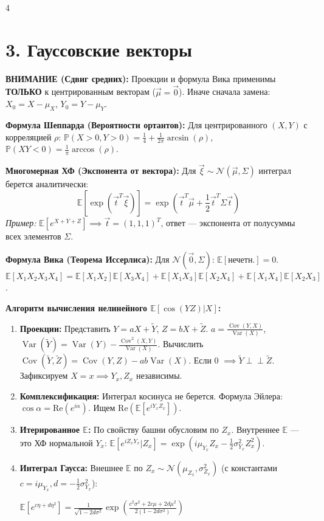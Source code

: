 \documentclass[a4paper, landscape]{article}
\newcommand{\E}{\mathbb{E}}
\renewcommand{\P}{\mathbb{P}}
\newcommand{\N}{\mathcal{N}}
\DeclareMathOperator{\Var}{Var}
\DeclareMathOperator{\Cov}{Cov}
\begin{document}
\begin{multicols*}{4}
\section*{3. Гауссовские векторы}
\textbf{ВНИМАНИЕ (Сдвиг средних):} Проекции и формула Вика применимы \textbf{ТОЛЬКО} к центрированным векторам ($\vec{\mu}=\vec{0}$). Иначе сначала замена: $X_0 = X-\mu_X$, $Y_0=Y-\mu_Y$.

\textbf{Формула Шеппарда (Вероятности ортантов):} 
Для центрированного $(X,Y)$ с корреляцией $\rho$:
$\P(X \!>\! 0, Y \!>\! 0) \!=\! \frac{1}{4} + \frac{1}{2\pi}\arcsin(\rho)$, \ $\P(XY \!<\! 0) \!=\! \frac{1}{\pi}\arccos(\rho)$.

\textbf{Многомерная ХФ (Экспонента от вектора):}
Для $\vec{\xi} \sim \N(\vec{\mu}, \Sigma)$ интеграл берется аналитически:
$$ \E[\exp(\vec{t}^T \vec{\xi})] = \exp\left( \vec{t}^T \vec{\mu} + \frac{1}{2} \vec{t}^T \Sigma \vec{t} \right) $$
\textit{Пример:} $\E[e^{X+Y+Z}] \implies \vec{t}=(1,1,1)^T$, ответ --- экспонента от полусуммы всех элементов $\Sigma$.

\textbf{Формула Вика (Теорема Иссерлиса):} Для $\N(\vec{0}, \Sigma)$: $\E[\text{нечетн.}]=0$. $\E[X_1 X_2 X_3 X_4] = \E[X_1 X_2]\E[X_3 X_4] + \E[X_1 X_3]\E[X_2 X_4] + \E[X_1 X_4]\E[X_2 X_3]$.

\textbf{Алгоритм вычисления нелинейного $\E[\cos(YZ)|X]$:}
\begin{enumerate}
    \item \textbf{Проекции:} Представить $Y \!=\! aX+\tilde{Y}$, $Z \!=\! bX+\tilde{Z}$.
    $a \!=\! \frac{\Cov(Y,X)}{\Var(X)}$, $\Var(\tilde{Y}) \!=\! \Var(Y) - \frac{\Cov^2(X,Y)}{\Var(X)}$.
    Вычислить $\Cov(\tilde{Y},\tilde{Z}) \!=\! \Cov(Y,Z) - ab\Var(X)$. Если 0 $\implies \tilde{Y} \perp\!\!\perp \tilde{Z}$. Зафиксируем $X=x \implies Y_x, Z_x$ независимы.
    \item \textbf{Комплексификация:} Интеграл косинуса не берется. Формула Эйлера: $\cos \alpha = \text{Re}(e^{i\alpha})$. Ищем $\text{Re}(\E[e^{iY_x Z_x}])$.
    \item \textbf{Итерированное $\E$:} По свойству башни обусловим по $Z_x$. Внутреннее $\E$ --- это ХФ нормальной $Y_x$:
    $\E[e^{i Z_x Y_x}|Z_x] = \exp(i\mu_{Y_x} Z_x - \frac{1}{2}\sigma_{Y_x}^2 Z_x^2)$.
    \item \textbf{Интеграл Гаусса:} Внешнее $\E$ по $Z_x \sim \N(\mu_{Z_x}, \sigma_{Z_x}^2)$ (с константами $c=i\mu_{Y_x}, d=-\frac{1}{2}\sigma_{Y_x}^2$):

    $ \E[e^{c\eta + d\eta^2}] = \frac{1}{\sqrt{1-2d\sigma^2}}\exp\left( \frac{c^2\sigma^2+2c\mu+2d\mu^2}{2(1-2d\sigma^2)} \right) $
\end{enumerate}


\end{multicols*}
\end{document}
